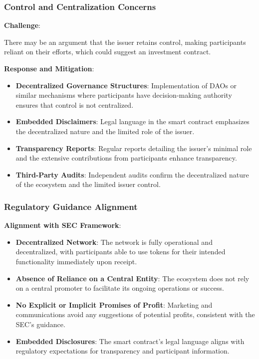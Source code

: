 \documentclass[a4paper,12pt]{article}
\begin{document}
\subsubsection{Control and Centralization Concerns}
\textbf{Challenge}:

There may be an argument that the issuer retains control, making participants reliant on their efforts, which could suggest an investment contract.

\textbf{Response and Mitigation}:

\begin{itemize}
\item \textbf{Decentralized Governance Structures}: Implementation of DAOs or similar mechanisms where participants have decision-making authority ensures that control is not centralized.
\item \textbf{Embedded Disclaimers}: Legal language in the smart contract emphasizes the decentralized nature and the limited role of the issuer.
\item \textbf{Transparency Reports}: Regular reports detailing the issuer's minimal role and the extensive contributions from participants enhance transparency.
\item \textbf{Third-Party Audits}: Independent audits confirm the decentralized nature of the ecosystem and the limited issuer control.
\end{itemize}

\subsubsection{Regulatory Guidance Alignment}
\textbf{Alignment with SEC Framework}:

\begin{itemize}
\item \textbf{Decentralized Network}: The network is fully operational and decentralized, with participants able to use tokens for their intended functionality immediately upon receipt.
\item \textbf{Absence of Reliance on a Central Entity}: The ecosystem does not rely on a central promoter to facilitate its ongoing operations or success.
\item \textbf{No Explicit or Implicit Promises of Profit}: Marketing and communications avoid any suggestions of potential profits, consistent with the SEC's guidance.
\item \textbf{Embedded Disclosures}: The smart contract's legal language aligns with regulatory expectations for transparency and participant information.
\end{itemize}
\end{document}
